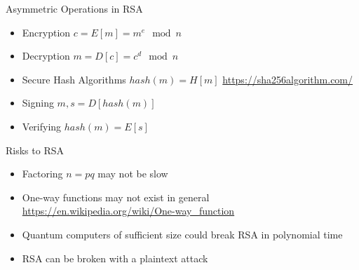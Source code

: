 \begin{withoutheadline}

\begin{frame}{Asymmetric Operations in RSA}
    \begin{itemize}
        \item Encryption $c = E[m] = m^e \mod n$
        \item Decryption $m = D[c] = c^d \mod n$
        \item Secure Hash Algorithms  $hash(m) = H[m]$ \url{https://sha256algorithm.com/}
        \item Signing    $m, s= D[hash(m)]$
        \item Verifying  $hash(m) = E[s]$
    \end{itemize}
\end{frame}

\begin{frame}{Risks to RSA}
    \begin{itemize}
        \item Factoring $n=pq$ may not be slow
        \item One-way functions may not exist in general
              \url{https://en.wikipedia.org/wiki/One-way\_function}
        \item Quantum computers of sufficient size could break RSA in polynomial time
        \item RSA can be broken with a plaintext attack
    \end{itemize}
\end{frame}



\end{withoutheadline}
